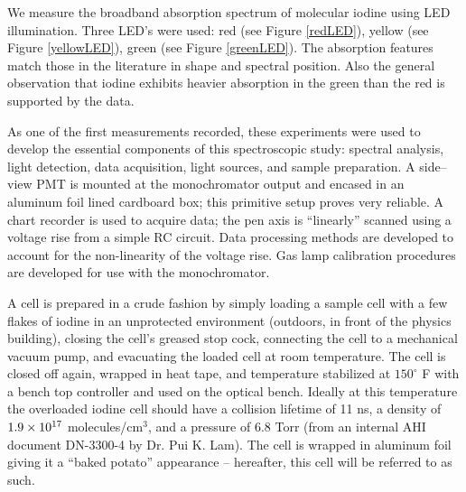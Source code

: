 \label{LED section}



We measure the broadband absorption spectrum of molecular iodine using LED illumination. Three LED's were used: red (see Figure \ref{redLED}), yellow (see Figure \ref{yellowLED}), green (see Figure \ref{greenLED}). The absorption features match those in the literature in shape and spectral position. Also the general observation that iodine exhibits heavier absorption in the green than the red is supported by the data.

As one of the first measurements recorded, these experiments were used to develop the essential components of this spectroscopic study: spectral analysis, light detection, data acquisition, light sources, and sample preparation. A side--view PMT is mounted at the monochromator output and encased in an aluminum foil lined cardboard box; this primitive setup proves very reliable. A chart recorder is used to acquire data; the pen axis is ``linearly'' scanned using a voltage rise from a simple RC circuit. Data processing methods are developed to account for the non-linearity of the voltage rise. Gas lamp calibration procedures are developed for use with the monochromator.

A cell is prepared in a crude fashion by simply loading a sample cell with a few flakes of iodine in an unprotected environment (outdoors, in front of the physics building), closing the cell's greased stop cock, connecting the cell to a mechanical vacuum pump, and evacuating the loaded cell at room temperature. The cell is closed off again, wrapped in heat tape, and temperature stabilized at $150^\circ$ F with a bench top controller and used on the optical bench. Ideally at this temperature the overloaded iodine cell should have a collision lifetime of 11 ns, a density of $1.9\times10^{17}$ molecules/cm$^3$, and a pressure of 6.8 Torr (from an internal AHI document DN-3300-4 by Dr. Pui K. Lam). The cell is wrapped in aluminum foil giving it a ``baked potato'' appearance -- hereafter, this cell will be referred to as such.

